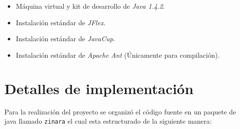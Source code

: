 \documentclass[12pt, spanish]{report}
\begin{document}
\begin{itemize}
\item M\'aquina virtual y kit de desarrollo de \emph{Java 1.4.2}.
\item Instalaci\'on est\'andar de \emph{JFlex}.
\item Instalaci\'on est\'andar de \emph{JavaCup}.
\item Instalaci\'on est\'andar de \emph{Apache Ant} (\'Unicamente para
  compilaci\'on).
\end{itemize}

\section{Detalles de implementaci\'on}
\label{sec:codigo}

Para la realizaci\'on del proyecto se organiz\'o el c\'odigo fuente en
un paquete de java llamado \texttt{zinara} el cual esta estructurado
de la siguiente manera:
\end{document}
